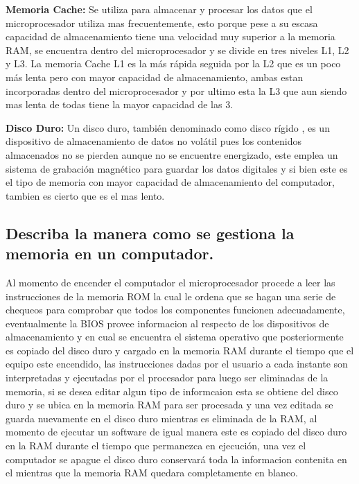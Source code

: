 \documentclass{article}
\begin{document}
\vspace{0.5cm}

\textbf{Memoria Cache:} Se utiliza para almacenar y procesar los datos que el microprocesador utiliza mas frecuentemente, esto porque pese a su escasa capacidad de almacenamiento tiene una velocidad muy superior a la memoria RAM, se encuentra dentro del microprocesador y se divide en tres niveles L1, L2 y L3. La memoria Cache L1 es la más rápida seguida por la L2 que es un poco más lenta pero con mayor capacidad de almacenamiento, ambas estan incorporadas dentro del microprocesador y por ultimo esta la L3 que aun siendo mas lenta de todas tiene la mayor capacidad de las 3.

\vspace{0.5cm}

\textbf{Disco Duro:} Un disco duro, también denominado como disco rígido , es un dispositivo de almacenamiento de datos no volátil pues los contenidos almacenados no se pierden aunque no se encuentre energizado, este emplea un sistema de grabación magnético para guardar los datos digitales y si bien este es el tipo de memoria con mayor capacidad de almacenamiento del computador, tambien es cierto que es el mas lento.

\subsection{Describa la manera como se gestiona la memoria en un computador.}

Al momento de encender el computador el microprocesador procede a leer las instrucciones de la memoria ROM la cual le ordena que se hagan una serie de chequeos para comprobar que todos los componentes funcionen adecuadamente, eventualmente la BIOS provee informacion al respecto de los dispositivos de almacenamiento y en cual se encuentra el sistema operativo que posteriormente es copiado del disco duro y cargado en la memoria RAM durante el tiempo que el equipo este encendido, las  instrucciones dadas por el usuario a cada instante son interpretadas y ejecutadas por el procesador para luego ser eliminadas de la memoria, si se desea editar algun tipo de informcaion esta se obtiene del disco duro y se ubica en la memoria RAM para ser procesada y una vez editada se guarda nuevamente en el disco duro mientras es eliminada de la RAM, al momento de ejecutar un software de igual manera este es copiado del disco duro en la RAM durante el tiempo que permanezca en ejecución, una vez el computador se apague el disco duro conservará toda la informacion contenita en el mientras que la memoria RAM quedara completamente en blanco.
\end{document}
